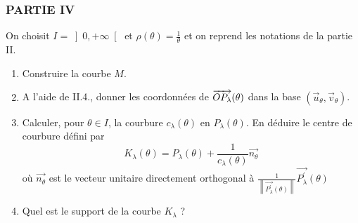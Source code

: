 \subsubsection*{PARTIE IV}

On choisit $I=\left] 0,+\infty \right[ $ et $\rho (\theta )=\frac{1}{\theta }
$ et on reprend les notations de la partie II.

\begin{enumerate}
\item  Construire la courbe $M$.

\item  A l'aide de II.4., donner les coordonn\'{e}es de $\overrightarrow{%
OP_{\lambda }}(\theta )$ dans la base $(\overrightarrow{u}_{\theta },%
\overrightarrow{v}_{\theta })$.

\item  Calculer, pour $\theta \in I$, la courbure $c_{\lambda }(\theta )$ en
$P_{\lambda }(\theta )$. En d\'{e}duire le centre de courbure d\'{e}fini par
\[
K_{\lambda }\left( \theta \right) =P_{\lambda }\left( \theta \right) +\frac{1%
}{c_{\lambda }\left( \theta \right) }\overrightarrow{n_{\theta }}
\]
o\`{u} $\overrightarrow{n_{\theta }}$ est le vecteur unitaire directement
orthogonal \`{a} $\frac{1}{\left\| \overrightarrow{P_{\lambda }^{\prime }}%
\left( \theta \right) \right\| }\overrightarrow{P_{\lambda }^{\prime }}%
\left( \theta \right) $

\item  Quel est le support de la courbe $K_{\lambda }$ ?
\end{enumerate}

